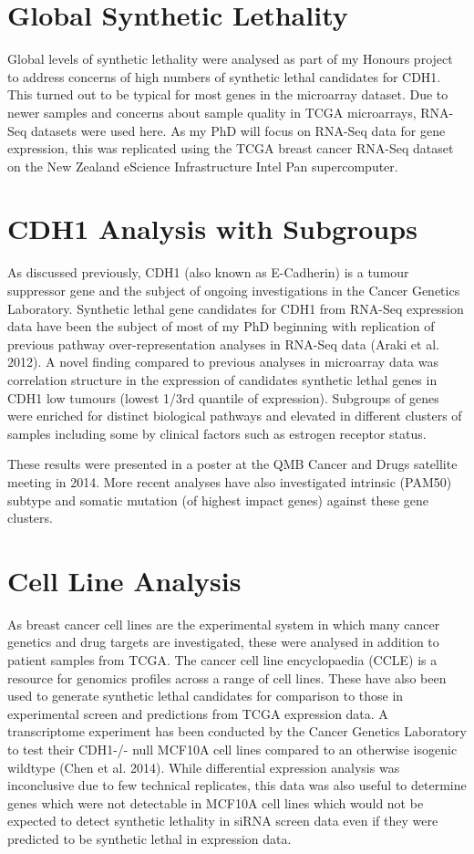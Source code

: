 \section{Global Synthetic Lethality}

Global levels of synthetic lethality were analysed as part of my Honours project to address concerns of high numbers of synthetic lethal candidates for CDH1. This turned out to be typical for most genes in the microarray dataset. Due to newer samples and concerns about sample quality in TCGA microarrays, RNA-Seq datasets were used here. As my PhD will focus on RNA-Seq data for gene expression, this was replicated using the TCGA breast cancer RNA-Seq dataset on the New Zealand eScience Infrastructure Intel Pan supercomputer.

\section{CDH1 Analysis with Subgroups}

As discussed previously, CDH1 (also known as E-Cadherin) is a tumour suppressor gene and the subject of ongoing investigations in the Cancer Genetics Laboratory. Synthetic lethal gene candidates for CDH1 from RNA-Seq expression data have been the subject of most of my PhD beginning with replication of previous pathway over-representation analyses in RNA-Seq data (Araki et al. 2012).  A novel finding compared to previous analyses in microarray data was correlation structure in the expression of candidates synthetic lethal genes in CDH1 low tumours (lowest 1/3rd quantile of expression). Subgroups of genes were enriched for distinct biological pathways and elevated in different clusters of samples including some by clinical factors such as estrogen receptor status.

These results were presented in a poster at the QMB Cancer and Drugs satellite meeting in 2014. More recent analyses have also investigated intrinsic (PAM50) subtype and somatic mutation (of highest impact genes) against these gene clusters.

\section{Cell Line Analysis}

As breast cancer cell lines are the experimental system in which many cancer genetics and drug targets are investigated, these were analysed in addition to patient samples from TCGA. The cancer cell line encyclopaedia (CCLE) is a resource for genomics profiles across a range of cell lines. These have also been used to generate synthetic lethal candidates for comparison to those in experimental screen and predictions from TCGA expression data.
A transcriptome experiment has been conducted by the Cancer Genetics Laboratory to test their CDH1-/- null MCF10A cell lines compared to an otherwise isogenic wildtype (Chen et al. 2014). While differential expression analysis was inconclusive due to few technical replicates, this data was also useful to determine genes which were not detectable in MCF10A cell lines which would not be expected to detect synthetic lethality in siRNA screen data even if they were predicted to be synthetic lethal in expression data. 

